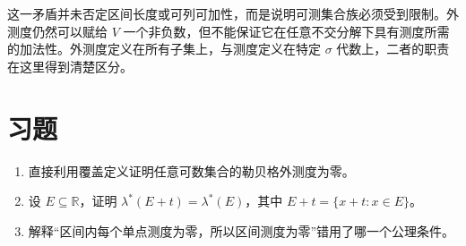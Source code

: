 这一矛盾并未否定区间长度或可列可加性，而是说明可测集合族必须受到限制。外测度仍然可以赋给 $V$ 一个非负数，但不能保证它在任意不交分解下具有测度所需的加法性。外测度定义在所有子集上，与测度定义在特定 $\sigma$ 代数上，二者的职责在这里得到清楚区分。

\section{习题}
\begin{enumerate}
 \item 直接利用覆盖定义证明任意可数集合的勒贝格外测度为零。
 \item 设 $E\subseteq\mathbb R$，证明 $\lambda^*(E+t)=\lambda^*(E)$，其中 $E+t=\{x+t:x\in E\}$。
 \item 解释“区间内每个单点测度为零，所以区间测度为零”错用了哪一个公理条件。
\end{enumerate}

